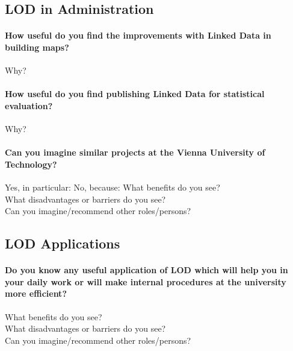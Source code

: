 \subsection*{LOD in Administration}
\vspace{0.5cm}

\paragraph{How useful do you find the improvements with Linked Data in building maps?}
{}
Why?
\opentwo

\paragraph{How useful do you find publishing Linked Data for statistical evaluation?}
{}
Why?
\opentwo

\newpage

\paragraph{Can you imagine similar projects at the Vienna University of Technology?}
Yes, in particular:
\opentwo
No, because:
\opentwo
What benefits do you see?\\
\opentwo
What disadvantages or barriers do you see?\\
\opentwo
Can you imagine/recommend other roles/persons?\\
\opentwo

\newpage

\subsection*{LOD Applications}
\paragraph{Do you know any useful application of LOD which will help you in your daily work or will make internal procedures at the university more efficient?}
\openfour
What benefits do you see?\\
\opentwo
What disadvantages or barriers do you see?\\
\opentwo
Can you imagine/recommend other roles/persons?\\
\opentwo
\newpage

